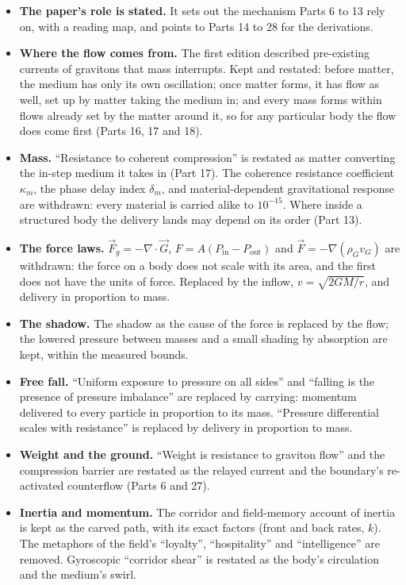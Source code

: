 \begin{itemize}
\item \textbf{The paper's role is stated.} It sets out the mechanism Parts 6 to 13 rely on, with a reading map, and points to Parts 14 to 28 for the derivations.
\item \textbf{Where the flow comes from.} The first edition described pre-existing currents of gravitons that mass interrupts. Kept and restated: before matter, the medium has only its own oscillation; once matter forms, it has flow as well, set up by matter taking the medium in; and every mass forms within flows already set by the matter around it, so for any particular body the flow does come first (Parts 16, 17 and 18).
\item \textbf{Mass.} ``Resistance to coherent compression'' is restated as matter converting the in-step medium it takes in (Part 17). The coherence resistance coefficient $\kappa_m$, the phase delay index $\delta_m$, and material-dependent gravitational response are withdrawn: every material is carried alike to $10^{-15}$. Where inside a structured body the delivery lands may depend on its order (Part 13).
\item \textbf{The force laws.} $\vec F_g = -\nabla\cdot\vec G$, $F = A(P_\text{in} - P_\text{out})$ and $\vec F = -\nabla(\rho_G v_G)$ are withdrawn: the force on a body does not scale with its area, and the first does not have the units of force. Replaced by the inflow, $v = \sqrt{2GM/r}$, and delivery in proportion to mass.
\item \textbf{The shadow.} The shadow as the cause of the force is replaced by the flow; the lowered pressure between masses and a small shading by absorption are kept, within the measured bounds.
\item \textbf{Free fall.} ``Uniform exposure to pressure on all sides'' and ``falling is the presence of pressure imbalance'' are replaced by carrying: momentum delivered to every particle in proportion to its mass. ``Pressure differential scales with resistance'' is replaced by delivery in proportion to mass.
\item \textbf{Weight and the ground.} ``Weight is resistance to graviton flow'' and the compression barrier are restated as the relayed current and the boundary's re-activated counterflow (Parts 6 and 27).
\item \textbf{Inertia and momentum.} The corridor and field-memory account of inertia is kept as the carved path, with its exact factors (front and back rates, $k$). The metaphors of the field's ``loyalty'', ``hospitality'' and ``intelligence'' are removed. Gyroscopic ``corridor shear'' is restated as the body's circulation and the medium's swirl.

\end{itemize}
